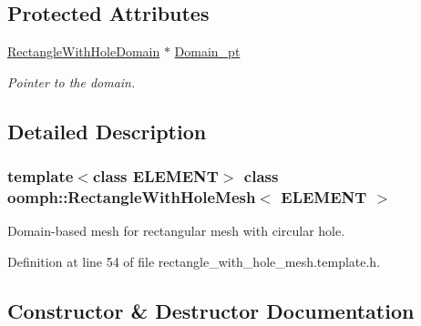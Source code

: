 \subsection*{Protected Attributes}
\begin{DoxyCompactItemize}
\item 
\hyperlink{classoomph_1_1RectangleWithHoleDomain}{Rectangle\+With\+Hole\+Domain} $\ast$ \hyperlink{classoomph_1_1RectangleWithHoleMesh_a04b200644403da650d38e707285e2b53}{Domain\+\_\+pt}
\begin{DoxyCompactList}\small\item\em Pointer to the domain. \end{DoxyCompactList}\end{DoxyCompactItemize}


\subsection{Detailed Description}
\subsubsection*{template$<$class E\+L\+E\+M\+E\+NT$>$\newline
class oomph\+::\+Rectangle\+With\+Hole\+Mesh$<$ E\+L\+E\+M\+E\+N\+T $>$}

Domain-\/based mesh for rectangular mesh with circular hole. 

Definition at line 54 of file rectangle\+\_\+with\+\_\+hole\+\_\+mesh.\+template.\+h.



\subsection{Constructor \& Destructor Documentation}
\mbox{\label{classoomph_1_1RectangleWithHoleMesh_aa5080c0cbd60211cafda6f8d77326eae}} 
